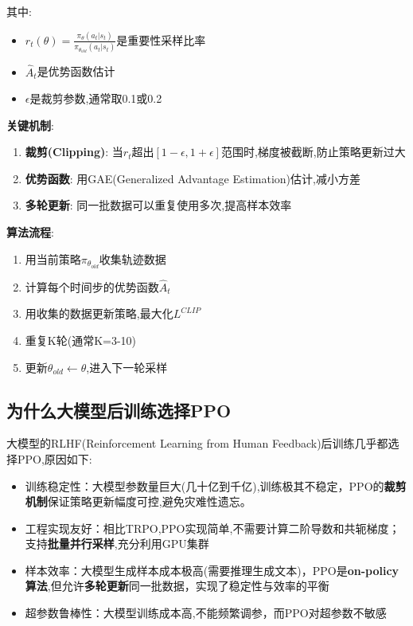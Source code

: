 \documentclass[UTF8]{ctexart}
\begin{document}
其中:
\begin{itemize}
    \item $r_t(\theta) = \frac{\pi_\theta(a_t|s_t)}{\pi_{\theta_{old}}(a_t|s_t)}$是重要性采样比率
    \item $\hat{A}_t$是优势函数估计
    \item $\epsilon$是裁剪参数,通常取0.1或0.2
\end{itemize}

\textbf{关键机制}:
\begin{enumerate}
    \item \textbf{裁剪(Clipping)}: 当$r_t$超出$[1-\epsilon, 1+\epsilon]$范围时,梯度被截断,防止策略更新过大
    \item \textbf{优势函数}: 用GAE(Generalized Advantage Estimation)估计,减小方差
    \item \textbf{多轮更新}: 同一批数据可以重复使用多次,提高样本效率
\end{enumerate}

\textbf{算法流程}:
\begin{enumerate}
    \item 用当前策略$\pi_{\theta_{old}}$收集轨迹数据
    \item 计算每个时间步的优势函数$\hat{A}_t$
    \item 用收集的数据更新策略,最大化$L^{CLIP}$
    \item 重复K轮(通常K=3-10)
    \item 更新$\theta_{old} \leftarrow \theta$,进入下一轮采样
\end{enumerate}

\subsection{为什么大模型后训练选择PPO}

大模型的RLHF(Reinforcement Learning from Human Feedback)后训练几乎都选择PPO,原因如下:
\begin{itemize}
    \item[1] 训练稳定性：大模型参数量巨大(几十亿到千亿),训练极其不稳定，PPO的\textbf{裁剪机制}保证策略更新幅度可控,避免灾难性遗忘。
    \item[2] 工程实现友好：相比TRPO,PPO实现简单,不需要计算二阶导数和共轭梯度；支持\textbf{批量并行采样},充分利用GPU集群
    \item[3] 样本效率：大模型生成样本成本极高(需要推理生成文本)，PPO是\textbf{on-policy算法},但允许\textbf{多轮更新}同一批数据，实现了稳定性与效率的平衡
    \item[4] 超参数鲁棒性：大模型训练成本高,不能频繁调参，而PPO对超参数不敏感
\end{itemize}
\end{document}
